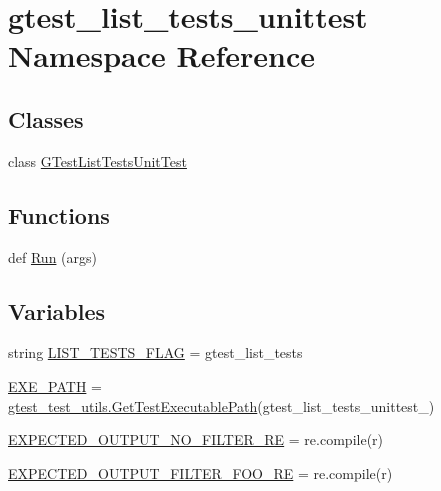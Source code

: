 \hypertarget{namespacegtest__list__tests__unittest}{}\section{gtest\+\_\+list\+\_\+tests\+\_\+unittest Namespace Reference}
\label{namespacegtest__list__tests__unittest}
\subsection*{Classes}
\begin{DoxyCompactItemize}
\item 
class \hyperlink{classgtest__list__tests__unittest_1_1_g_test_list_tests_unit_test}{G\+Test\+List\+Tests\+Unit\+Test}
\end{DoxyCompactItemize}
\subsection*{Functions}
\begin{DoxyCompactItemize}
\item 
def \hyperlink{namespacegtest__list__tests__unittest_ae820a362ba09ad61331e3f0c2a9f9cb6}{Run} (args)
\end{DoxyCompactItemize}
\subsection*{Variables}
\begin{DoxyCompactItemize}
\item 
string \hyperlink{namespacegtest__list__tests__unittest_a658d9ea18c57a13a25d0cce73d314e7a}{L\+I\+S\+T\+\_\+\+T\+E\+S\+T\+S\+\_\+\+F\+L\+AG} = \textquotesingle{}gtest\+\_\+list\+\_\+tests\textquotesingle{}
\item 
\hyperlink{namespacegtest__list__tests__unittest_ae58203009c92b993b4d1cabae4d5eb19}{E\+X\+E\+\_\+\+P\+A\+TH} = \hyperlink{namespacegtest__test__utils_a89ed3717984a80ffbb7a9c92f71b86a2}{gtest\+\_\+test\+\_\+utils.\+Get\+Test\+Executable\+Path}(\textquotesingle{}gtest\+\_\+list\+\_\+tests\+\_\+unittest\+\_\+\textquotesingle{})
\item 
\hyperlink{namespacegtest__list__tests__unittest_a29efbf77d2682ce359327e2e7dbd1c46}{E\+X\+P\+E\+C\+T\+E\+D\+\_\+\+O\+U\+T\+P\+U\+T\+\_\+\+N\+O\+\_\+\+F\+I\+L\+T\+E\+R\+\_\+\+RE} = re.\+compile(r)
\item 
\hyperlink{namespacegtest__list__tests__unittest_a1a20fef56cfe698649d63bc0c2b40229}{E\+X\+P\+E\+C\+T\+E\+D\+\_\+\+O\+U\+T\+P\+U\+T\+\_\+\+F\+I\+L\+T\+E\+R\+\_\+\+F\+O\+O\+\_\+\+RE} = re.\+compile(r)
\end{DoxyCompactItemize}


